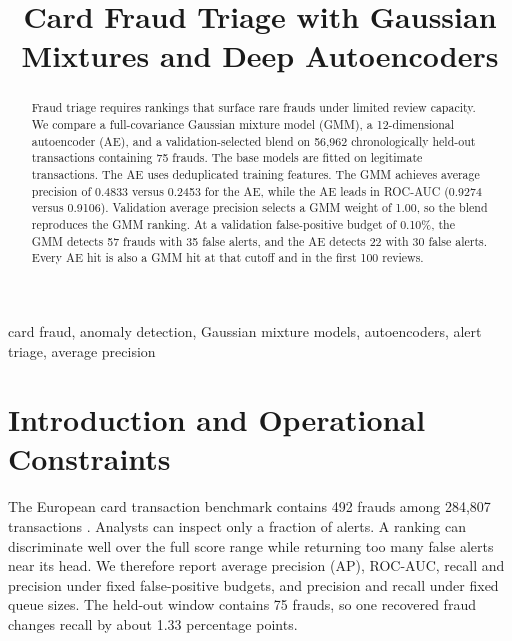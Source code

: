 \documentclass[conference]{IEEEtran}
\begin{document}
\title{Card Fraud Triage with Gaussian Mixtures and Deep Autoencoders}
\author{
}
\maketitle
\raggedbottom

\begin{abstract}
Fraud triage requires rankings that surface rare frauds under limited review capacity. We compare a full-covariance Gaussian mixture model (GMM), a 12-dimensional autoencoder (AE), and a validation-selected blend on 56,962 chronologically held-out transactions containing 75 frauds. The base models are fitted on legitimate transactions. The AE uses deduplicated training features. The GMM achieves average precision of 0.4833 versus 0.2453 for the AE, while the AE leads in ROC-AUC (0.9274 versus 0.9106). Validation average precision selects a GMM weight of 1.00, so the blend reproduces the GMM ranking. At a validation false-positive budget of 0.10\%, the GMM detects 57 frauds with 35 false alerts, and the AE detects 22 with 30 false alerts. Every AE hit is also a GMM hit at that cutoff and in the first 100 reviews.
\end{abstract}

\begin{IEEEkeywords}
card fraud, anomaly detection, Gaussian mixture models, autoencoders, alert triage, average precision
\end{IEEEkeywords}

\section{Introduction and Operational Constraints}
The European card transaction benchmark contains 492 frauds among 284,807 transactions \cite{dalpozzolo}. Analysts can inspect only a fraction of alerts. A ranking can discriminate well over the full score range while returning too many false alerts near its head. We therefore report average precision (AP), ROC-AUC, recall and precision under fixed false-positive budgets, and precision and recall under fixed queue sizes. The held-out window contains 75 frauds, so one recovered fraud changes recall by about 1.33 percentage points.
\end{document}
